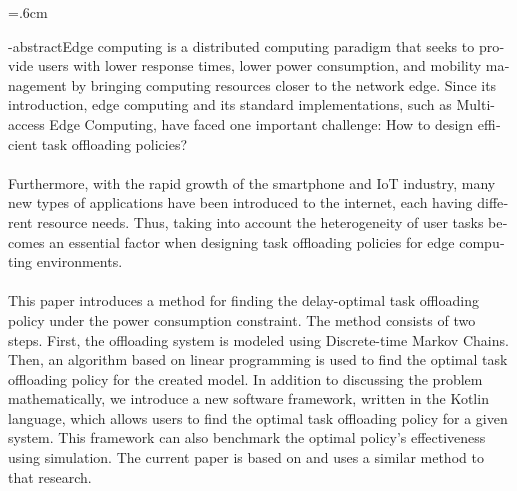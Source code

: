 
\baselineskip=.6cm
\begin{latin}
\en-abstract{Edge computing is a distributed computing paradigm that seeks to provide users with lower response times, lower power consumption, and mobility management by bringing computing resources closer to the network edge. Since its introduction, edge computing and its standard implementations, such as Multi-access Edge Computing, have faced one important challenge: How to design efficient task offloading policies? \\ \\ Furthermore, with the rapid growth of the smartphone and IoT industry, many new types of applications have been introduced to the internet, each having different resource needs. Thus, taking into account the heterogeneity of user tasks becomes an essential factor when designing task offloading policies for edge computing environments.\\ \\This paper introduces a method for finding the delay-optimal task offloading policy under the power consumption constraint. The method consists of two steps. First, the offloading system is modeled using Discrete-time Markov Chains. Then, an algorithm based on linear programming is used to find the optimal task offloading policy for the created model. In addition to discussing the problem mathematically, we introduce a new software framework, written in the Kotlin language, which allows users to find the optimal task offloading policy for a given system. This framework can also benchmark the optimal policy's effectiveness using simulation. The current paper is based on \cite{Liu} and uses a similar method to that research.  
}
\latinfirstPage
\end{latin}
